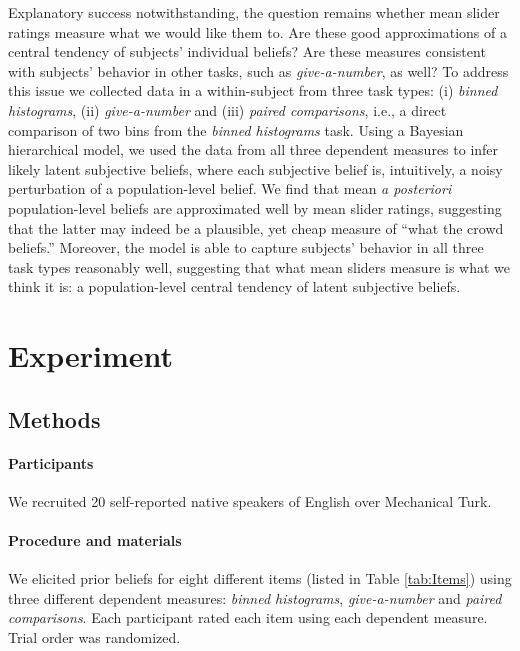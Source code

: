 \documentclass[10pt,letterpaper]{article}
\newcommand{\tableref}[1]{Table \ref{#1}}
\begin{document}
Explanatory success notwithstanding, the question remains whether mean slider ratings measure
what we would like them to. Are these good approximations of a central tendency of subjects'
individual beliefs? Are these measures consistent with subjects' behavior in other tasks, such
as \emph{give-a-number}, as well? To address this issue we collected data in a within-subject
from three task types: (i) \emph{binned histograms}, (ii) \emph{give-a-number} and (iii)
\emph{paired comparisons}, i.e., a direct comparison of two bins from the \emph{binned
  histograms} task. Using a Bayesian hierarchical model, we used the data from all three
dependent measures to infer likely latent subjective beliefs, where each subjective belief is,
intuitively, a noisy perturbation of a population-level belief. We find that mean \emph{a
  posteriori} population-level beliefs are approximated well by mean slider ratings, suggesting
that the latter may indeed be a plausible, yet cheap measure of ``what the crowd beliefs.''
Moreover, the model is able to capture subjects' behavior in all three task types reasonably
well, suggesting that what mean sliders measure is what we think it is: a population-level
central tendency of latent subjective beliefs.

\section{Experiment}

\subsection{Methods} 

\paragraph{Participants} We recruited 20 self-reported native speakers of English over Mechanical Turk.

\paragraph{Procedure and materials}

We elicited prior beliefs for eight different items (listed in
\tableref{tab:Items}) using three different dependent measures: \emph{binned histograms},
\emph{give-a-number} and \emph{paired comparisons}. Each participant rated each item using each
dependent measure. Trial order was randomized.
\end{document}
